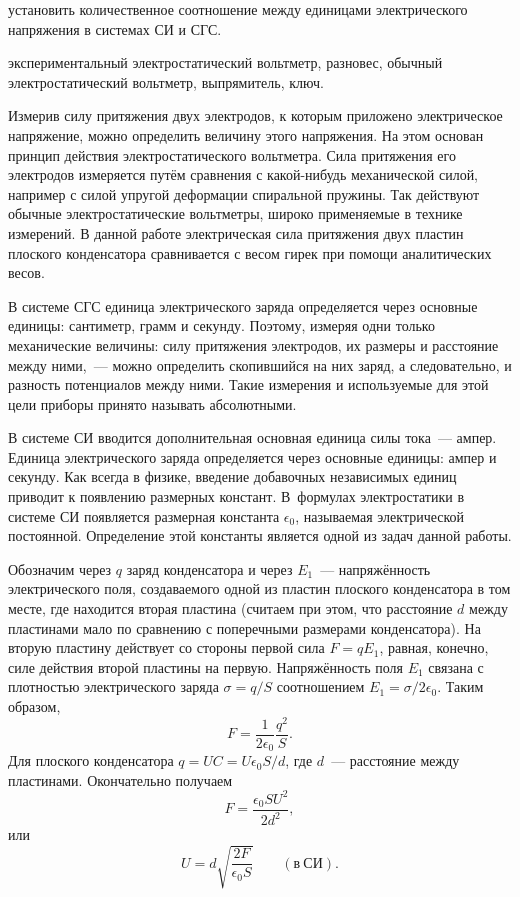 
\begin{lab:aim}
	установить количественное соотношение между единицами электрического напряжения в системах СИ и СГС.
\end{lab:aim}

\begin{lab:equipment}
	экспериментальный электростатический вольтметр, разновес, обычный электростатический вольтметр, выпрямитель, ключ.
\end{lab:equipment}

Измерив силу притяжения двух электродов, к которым приложено электрическое напряжение, можно определить величину этого
напряжения. На этом основан принцип действия электростатического вольтметра. Сила притяжения его электродов измеряется
путём сравнения с какой-нибудь механической силой, например с силой упругой деформации спиральной пружины. Так действуют
обычные электростатические вольтметры, широко применяемые в технике измерений. В данной работе электрическая сила
притяжения двух пластин плоского конденсатора сравнивается с весом гирек при помощи аналитических весов.

В системе СГС единица электрического заряда определяется через основные единицы: сантиметр, грамм и секунду. Поэтому,
измеряя одни только механические величины: силу притяжения электродов, их размеры и расстояние между ними,~--- можно
определить скопившийся на них заряд, а следовательно, и разность потенциалов между ними. Такие измерения и используемые
для этой цели приборы принято называть абсолютными.

В системе СИ вводится дополнительная основная единица силы тока~--- ампер. Единица электрического заряда определяется
через основные единицы: ампер и секунду. Как всегда в физике, введение добавочных независимых единиц приводит к
появлению размерных констант. В~формулах электростатики в системе СИ появляется размерная константа $\epsilon_0$, называемая
электрической постоянной. Определение этой константы является одной из задач данной работы.

Обозначим через $q$ заряд конденсатора и через $E_1$~--- напряжённость электрического поля, создаваемого одной из
пластин плоского конденсатора в том месте, где находится вторая пластина (считаем при этом, что расстояние $d$ между
пластинами мало по сравнению с поперечными размерами конденсатора). На вторую пластину действует со стороны первой сила
$F=qE_1$, равная, конечно, силе действия второй пластины на первую. Напряжённость поля $E_1$ связана с плотностью
электрического заряда $\sigma = q/S$ соотношением $E_1 = \sigma /2 \epsilon_0$. Таким образом,
\begin{equation}
	F=\frac{1}{2\epsilon_0}\frac{q^2}{S}.
\end{equation}
Для плоского конденсатора $q=UC=U \epsilon_0 S/d$, где $d$~--- расстояние между пластинами. Окончательно получаем
\begin{equation}
	F=\frac{\epsilon_0 SU^2}{2d^2},
\end{equation}
или
\begin{equation}
	U=d\sqrt{\frac{2F}{\epsilon_0 S}}\qquad(в~СИ).
\end{equation}

